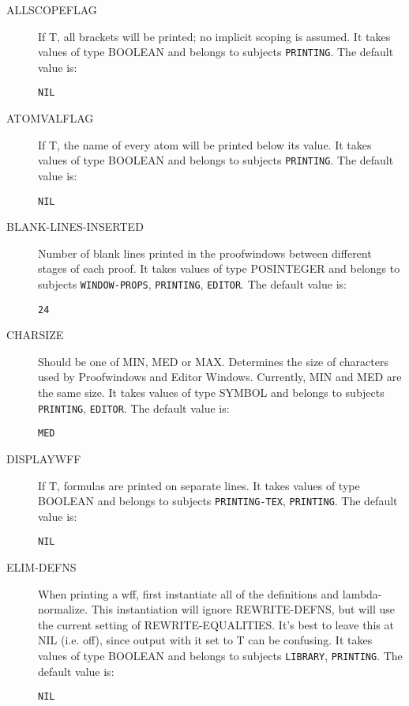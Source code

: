 \begin{description} 
\item[ALLSCOPEFLAG]  
If T, all brackets will be printed; no implicit scoping is assumed.
It takes values of type BOOLEAN and belongs to subjects \texttt{PRINTING}.  The default value is: \begin{lstlisting}
NIL
\end{lstlisting}

\item[ATOMVALFLAG]  
If T, the name of every atom will be printed below its value.
It takes values of type BOOLEAN and belongs to subjects \texttt{PRINTING}.  The default value is: \begin{lstlisting}
NIL
\end{lstlisting}

\item[BLANK-LINES-INSERTED]  
Number of blank lines printed in the proofwindows between different
stages of each proof.
It takes values of type POSINTEGER and belongs to subjects \texttt{WINDOW-PROPS}, \texttt{PRINTING}, \texttt{EDITOR}.  The default value is: \begin{lstlisting}
24
\end{lstlisting}

\item[CHARSIZE]  
Should be one of MIN, MED or MAX. 
Determines the size of characters used by Proofwindows and Editor Windows.
Currently, MIN and MED are the same size.
It takes values of type SYMBOL and belongs to subjects \texttt{PRINTING}, \texttt{EDITOR}.  The default value is: \begin{lstlisting}
MED
\end{lstlisting}

\item[DISPLAYWFF]  
If T, formulas are printed on separate lines.
It takes values of type BOOLEAN and belongs to subjects \texttt{PRINTING-TEX}, \texttt{PRINTING}.  The default value is: \begin{lstlisting}
NIL
\end{lstlisting}

\item[ELIM-DEFNS]  
When printing a wff, first instantiate all of the definitions
and lambda-normalize. This instantiation will ignore REWRITE-DEFNS, but 
will use the current setting of REWRITE-EQUALITIES.
It's best to leave this at NIL (i.e. off), since output with it set to T can 
be confusing.
It takes values of type BOOLEAN and belongs to subjects \texttt{LIBRARY}, \texttt{PRINTING}.  The default value is: \begin{lstlisting}
NIL
\end{lstlisting}


\end{description}
